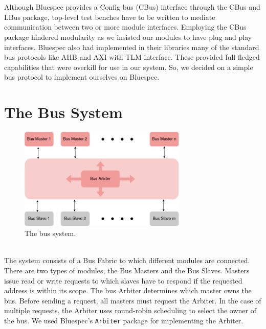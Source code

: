 \begin{paper}
\renewcommand*{\pagemark}{}

\section*{}
Although Bluespec provides a Config bus (CBus) interface through the CBus and LBus package, top-level test benches have to be written to mediate communication between two or more module interfaces. Employing the CBus package hindered modularity as we insisted our modules to have plug and play interfaces. Bluespec also had implemented in their libraries many of the standard bus protocols like AHB and AXI with TLM interface. These provided full-fledged capabilities that were overkill for use in our system. So, we decided on a simple bus protocol to implement ourselves on Bluespec.
\section*{The Bus System\sdot}
\begin{figure}[H]
\centering
\includegraphics[width=8cm]{Images/Overview-Bus.png}
\caption{\content The bus system.}
\end{figure}\\
\nointend The system consists of a Bus Fabric to which different modules are connected. There are two types of modules, the Bus Masters and the Bus Slaves. Masters issue read or write requests to which slaves have to respond if the requested address is within its scope. The bus Arbiter determines which master owns the bus. Before sending a request, all masters must request the Arbiter. In the case of multiple requests, the Arbiter uses round-robin scheduling to select the owner of the bus. We used Bluespec's \texttt{Arbiter} package for implementing the Arbiter.

\end{paper}
